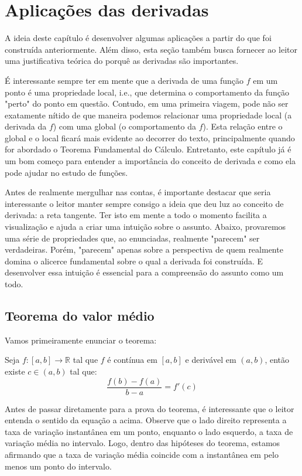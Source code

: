 
\chapter{Aplicações das derivadas}\label{cap:apl_derivadas}

\emconstrucao

	A ideia deste capítulo é desenvolver algumas aplicações a partir do que foi construída anteriormente. Além disso, esta seção também busca fornecer ao leitor uma justificativa teórica do porquê as derivadas são importantes. 

	É interessante sempre ter em mente que a derivada de uma função $f$ em um ponto é uma propriedade local, i.e., que determina o comportamento da função "perto" do ponto em questão. Contudo, em uma primeira viagem, pode não ser exatamente nítido de que maneira podemos relacionar uma propriedade local (a derivada da $f$) com uma global (o comportamento da $f$). Esta relação entre o global e o local ficará mais evidente ao decorrer do texto, principalmente quando for abordado o Teorema Fundamental do Cálculo. Entretanto, este capítulo já é um bom começo para entender a importância do conceito de derivada e como ela pode ajudar no estudo de funções.
	
	Antes de realmente mergulhar nas contas, é importante destacar que seria interessante o leitor manter sempre consigo a ideia que deu luz ao conceito de derivada: a reta tangente. Ter isto em mente a todo o momento facilita a visualização e ajuda a criar uma intuição sobre o assunto. Abaixo, provaremos uma série de propriedades que, ao enunciadas, realmente "parecem" ser verdadeiras. Porém, "parecem" apenas sobre a perspectiva de quem realmente domina o alicerce fundamental sobre o qual a derivada foi construída. E desenvolver essa intuição é essencial para a compreensão do assunto como um todo.
 
\section{Teorema do valor médio}
\construirSec
Vamos primeiramente enunciar o teorema:
	\begin{teo}
		Seja $f:[a,b]\to \mathbb{R}$ tal que $f$ é contínua em $[a,b]$ e derivável em $(a,b)$, então existe $c \in (a,b)$ tal que:
		$$\frac{f(b) - f(a)}{b - a} = f'(c)$$
	\end{teo}
	Antes de passar diretamente para a prova do teorema, é interessante que o leitor entenda o sentido da equação a acima. Observe que o lado direito representa a taxa de variação instantânea em um ponto, enquanto o lado esquerdo, a taxa de variação média no intervalo. Logo, dentro das hipóteses do teorema, estamos afirmando que a taxa de variação média coincide com a instantânea em pelo menos um ponto do intervalo. 
	
